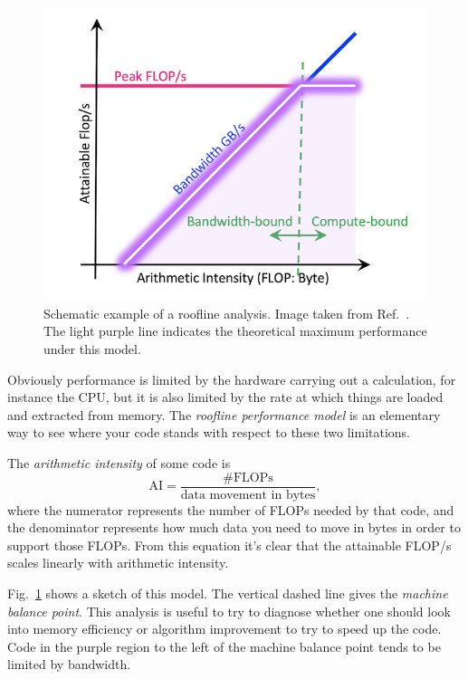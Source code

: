 \begin{figure}[t]
  \centering
  \includegraphics[width=0.8\linewidth]{figs/Roofline-intro.png}
  \caption{Schematic example of a roofline analysis.
           Image taken from Ref.~\cite{roofline}.
           The light purple line indicates the theoretical
           maximum performance under this model.}
  \label{fig:roofline}
\end{figure}

Obviously performance is limited by the hardware carrying out a calculation, for
instance the CPU, but it is also limited by the rate at which things are loaded
and extracted from memory. The {\it roofline performance model} is an elementary
way to see where your code stands with respect to these two limitations.

The {\it arithmetic intensity} of some code is
\begin{equation}
  \text{AI}=\frac{\text{\# FLOPs}}{\text{data movement in bytes}},
\end{equation}
where the numerator represents the number of FLOPs needed by that code, and the
denominator represents how much data you need to move in bytes in order to
support those FLOPs. From this equation it's clear that the attainable
FLOP/s scales linearly with arithmetic intensity.

Fig.~\ref{fig:roofline} shows a sketch of this model. The vertical
dashed line gives the {\it machine balance point}.
This analysis is useful to try to diagnose whether one should look into
memory efficiency or algorithm improvement to try to speed up the code.
Code in the purple region to the left of the machine balance point
tends to be limited by bandwidth.


